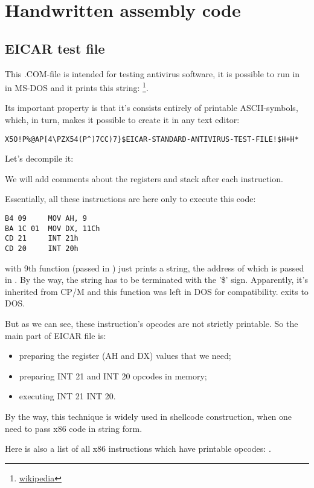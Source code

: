 \chapter{Handwritten assembly code}

\section{ EICAR test file}
\label{subsec:EICAR}

This .COM-file is intended for testing antivirus software, it is possible to run in
in MS-DOS and it prints this string: 
\footnote{\href{http://go.yurichev.com/17006}{wikipedia}}.

Its important property is that it's consists entirely of printable 
ASCII-symbols, which, in turn, makes it possible to create it in any text editor:

\begin{lstlisting}
X5O!P%@AP[4\PZX54(P^)7CC)7}$EICAR-STANDARD-ANTIVIRUS-TEST-FILE!$H+H*
\end{lstlisting}

Let's decompile it:



%
We will add comments about the registers and stack after each instruction.

Essentially, all these
instructions are here only to execute this code:

\begin{lstlisting}
B4 09     MOV AH, 9
BA 1C 01  MOV DX, 11Ch
CD 21     INT 21h
CD 20     INT 20h
\end{lstlisting}

 with 9th
function (passed in ) just prints a string, the address of which is passed in .
By the way, the string has to be terminated
with the '\$' sign.
Apparently, it's inherited from \gls{CP/M} 
and this function was left in DOS for compatibility.
 exits to DOS.

But as we can see, these instruction's
opcodes are not strictly printable.
So the main part of EICAR file is:

\begin{itemize}
\item preparing the register (AH and DX) values that we need;
\item preparing INT 21 and INT 20 opcodes in memory;
\item executing INT 21 \AndENRU INT 20.
\end{itemize}


By the way, this technique is widely used in shellcode construction, when one need to pass x86 code
in string form.

Here is also a list of all 
x86 instructions which have printable opcodes: .
